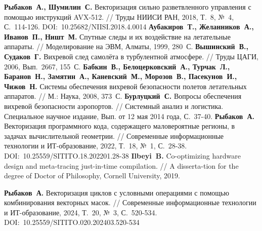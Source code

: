 \begin{thebibliography}{99}
%
\textbf{Рыбаков~А., Шумилин~С.} Векторизация сильно разветвленного управления с помощью инструкций AVX-512. // Труды НИИСИ РАН, 2018, Т.~8, №~4, С.~114-126. DOI:~10.25682/NIISI.2018.4.0014
%
\textbf{Аубакиров~Т., Желанников~А., Иванов~П., Ништ~М.} Спутные следы и их воздействие на летательные аппараты. // Моделирование на ЭВМ, Алматы, 1999, 280~С.
%
\textbf{Вышинский~В., Судаков~Г.} Вихревой след самолёта в турбулентной атмосфере. // Труды ЦАГИ, 2006, Вып.~2667, 155~С.
%
\textbf{Бабкин~В., Белоцерковский~А., Турчак~Л., Баранов~Н., Замятин~А., Каневский~М., Морозов~В., Пасекунов~И., Чижов~Н.} Системы обеспечения вихревой безопасности полетов летательных аппаратов. // М.: Наука, 2008, 373~С.
%
\textbf{Бурлуцкий~С.} Вопросы обеспечения вихревой безопасности аэропортов. // Системный анализ и логистика. Специальное научное издание, Вып. от 12 мая 2014 года, С.~37-40.
%
\textbf{Рыбаков~А.} Векторизация программного кода, содержащего маловероятные регионы, в задачах вычислительной геометрии. // Современные информационные технологии и ИТ-образование, 2022, Т.~18, №~1, С.~28-38. DOI:~10.25559/SITITO.18.202201.28-38
%
\textbf{Ilbeyi~B.} Co-optimizing hardware design and meta-tracing just-in-time compilation. // A disserta-tion for the degree of Doctor of Philosophy, Cornell University, 2019.
%



%
\textbf{Рыбаков~А.} Векторизация циклов с условными операциями с помощью комбинирования векторных масок. // Современные информационные технологии и ИТ-образование, 2024, Т.~20, №~3, С.~520-534. DOI:~10.25559/SITITO.020.202403.520-534
%



%
%




\end{thebibliography}

